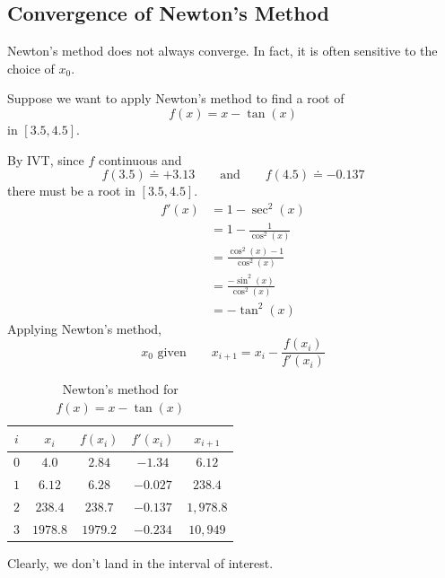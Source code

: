\subsection{Convergence of Newton's Method}

\begin{remark}
    Newton's method does not always converge. In fact, it is often sensitive to the choice of \( x_0 \).
\end{remark}

\begin{example}
    Suppose we want to apply Newton's method to find a root of \[
        f(x) = x - \tan(x)
    \] in \( [3.5, 4.5] \).

    By IVT, since \(f\) continuous and \[
        f(3.5) \doteq +3.13
        \qquad \text{and} \qquad
        f(4.5) \doteq -0.137
    \] there must be a root in \( [3.5, 4.5] \).
    \begin{align*}
        f'(x)
         & = 1 - \sec^2(x)                   \\
         & = 1 - \frac{1}{\cos^2(x)}         \\
         & = \frac{\cos^2(x) - 1}{\cos^2(x)} \\
         & = \frac{-\sin^2(x)}{\cos^2(x)}    \\
         & = -\tan^2(x)
    \end{align*}
    Applying Newton's method, \[
        x_0 \text{ given} \qquad x_{i+1} = x_i - \frac{f(x_i)}{f'(x_i)}
    \]

    \begin{table}[H]
        \centering
        \begin{tabular}{c|c|c|c|c}
            \( i \)
             & \( x_i \)
             & \( f(x_i) \)
             & \( f'(x_i) \)
             & \( x_{i+1} \)
            \\ \hline \hline
            \( 0 \)
             & \( 4.0 \)
             & \( 2.84 \)
             & \( -1.34 \)
             & \( 6.12 \)
            \\
            \( 1 \)
             & \( 6.12 \)
             & \( 6.28 \)
             & \( -0.027 \)
             & \( 238.4 \)
            \\
            \( 2 \)
             & \( 238.4 \)
             & \( 238.7 \)
             & \( -0.137 \)
             & \( 1,978.8 \)
            \\
            \( 3 \)
             & \( 1978.8 \)
             & \( 1979.2 \)
             & \( -0.234 \)
             & \( 10,949 \)
        \end{tabular}
        \caption{Newton's method for \( f(x) = x - \tan(x) \)}
    \end{table}
    Clearly, we don't land in the interval of interest.


\end{example}
